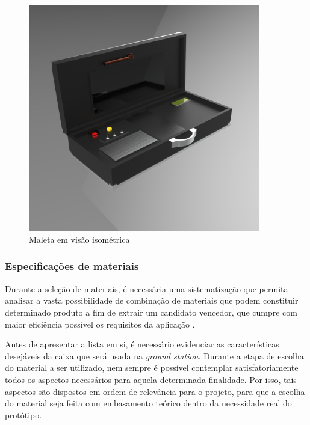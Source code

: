 \begin{figure}[H]
\centering
\includegraphics[width=0.9\textwidth]{figuras/maletaiso}
\caption{Maleta em visão isométrica }
\label{fig:maleta02}
\end{figure}

\subsubsection{Especificações de materiais}
\label{sub:Especificações de materiais}

\par Durante a seleção de materiais, é necessária uma sistematização que permita analisar a vasta possibilidade de combinação de materiais que podem constituir determinado produto a fim de extrair um candidato vencedor, que cumpre com maior eficiência possível os requisitos da aplicação \cite{walterconteudo}.

\par Antes de apresentar a lista em si, é necessário evidenciar as características desejáveis da caixa que será usada na \textit{ground station}. Durante a etapa de escolha do material a ser utilizado, nem sempre é possível contemplar satisfatoriamente todos os aspectos necessários para aquela determinada finalidade. Por isso, tais aspectos são dispostos em ordem de relevância para o projeto, para que a escolha do material seja feita com embasamento teórico dentro da necessidade real do protótipo. 

